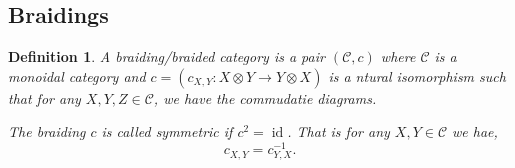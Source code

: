 \documentclass{article}
\newtheorem{definition}{Definition}[section]
\numberwithin{equation}{theorem}
\DeclareMathOperator{\id}{id}
\newcommand{\cat}[0]{\mathscr{C}}
\begin{document}
\subsection{Braidings}
\begin{definition}
  A braiding/braided category is a pair $(\cat,c)$ where $\cat$ is a monoidal category and $c = (c_{X,Y}:X\otimes Y\to Y\otimes X)$ is a ntural isomorphism such that for any $X,Y,Z\in\cat$, we have the commudatie diagrams.
  \begin{center}
  \end{center}
  The braiding $c$ is called symmetric if $c^2=\id$. That is for any $X,Y\in\cat$ we hae,
  \begin{equation*}
    c_{X,Y} = c_{Y,X}^{-1}.
  \end{equation*}
\end{definition}
\end{document}
